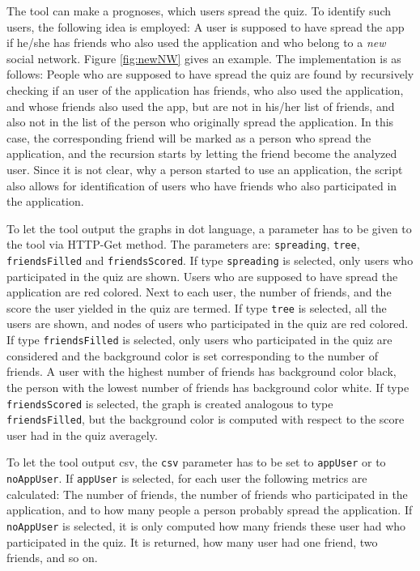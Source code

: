 \documentclass[preprint,12pt]{elsarticle}
\begin{document}
The tool can make a prognoses, which users spread the quiz. To
identify such users, the following idea is employed:
A user is supposed to have spread the app if he/she has
friends who also used the application and who belong to a \textit{new}
social network. Figure \ref{fig:newNW} gives an example.
The implementation is as follows: People who are supposed to have
spread the quiz are found by recursively checking if an user of 
the application has friends, who also used the application, and whose friends
also used the app, but are not in his/her list of friends, and also not in the list of the person
who originally spread the application. In this case, the corresponding
friend will be marked as a person who spread the application, and the
recursion starts by letting the friend become the analyzed user.
Since it is not clear, why a person started to use an application, the
script also allows for identification of users who have friends 
who also participated in the application. 

To let the tool output the graphs in \ac{dot} language, a parameter
has to be given to the tool via HTTP-Get method. The parameters are:
\verb|spreading|, \verb|tree|, \verb|friendsFilled| and
\verb|friendsScored|. If type \verb|spreading| is selected, only users
who participated in the quiz are shown. Users who are supposed to have
spread the application are red colored. Next to each user, the number
of friends, and the score the user yielded in the quiz are termed. If
type \verb|tree| is 
selected, all the users are shown, and nodes of users who participated
in the quiz are red colored. If type \verb|friendsFilled| is selected,
only users who participated in the quiz are considered and the
background color is set corresponding to the number of friends. A user
with the highest number of friends has background color black, the
person with the lowest number of friends has background color
white. If type \verb|friendsScored| is selected, the graph is created
analogous to type \verb|friendsFilled|, but the background color is
computed with respect to the score user had in the quiz averagely. 

To let the tool output \ac{csv}, the \verb|csv| parameter has to be
set to \verb|appUser| or to \verb|noAppUser|. 
If \verb|appUser| is selected, for each user the following metrics are
calculated: The number of friends, the number of friends who
participated in the application, and to how many people a person
probably spread the application.  If \verb|noAppUser| is selected, it
is only computed how many friends these user had who participated in
the quiz. It is returned, how many user had one friend, two friends,
and so on.
\end{document}
